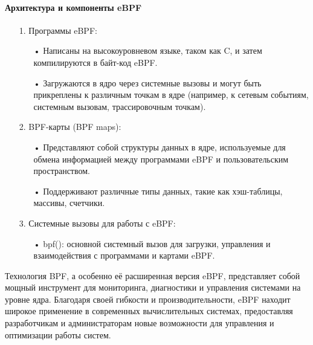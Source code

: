\begin{flushleft}
\newpage

\paragraph{Архитектура и компоненты eBPF}

\begin{itemize}
	\item[1.] Программы eBPF:
		\begin{itemize}
			\item[•] Написаны на высокоуровневом языке, таком как C, и затем компилируются в байт-код eBPF.
			\item[•] Загружаются в ядро через системные вызовы и могут быть прикреплены к различным точкам в ядре (например, к сетевым событиям, системным вызовам, трассировочным точкам).
		\end{itemize}
		
	\item [2.] BPF-карты (BPF maps):
		\begin{itemize}
			\item[•] Представляют собой структуры данных в ядре, используемые для обмена информацией между программами eBPF и пользовательским пространством.
			\item[•] Поддерживают различные типы данных, такие как хэш-таблицы, массивы, счетчики.
		\end{itemize}
		
	\item[3.] Системные вызовы для работы с eBPF:
		\begin{itemize}
			\item[•] bpf(): основной системный вызов для загрузки, управления и взаимодействия с программами и картами eBPF.
		\end{itemize}
\end{itemize}


Технология BPF, а особенно её расширенная версия eBPF, представляет собой мощный инструмент для мониторинга, диагностики и управления системами на уровне ядра. Благодаря своей гибкости и производительности, eBPF находит широкое применение в современных вычислительных системах, предоставляя разработчикам и администраторам новые возможности для управления и оптимизации работы систем.

\end{flushleft}